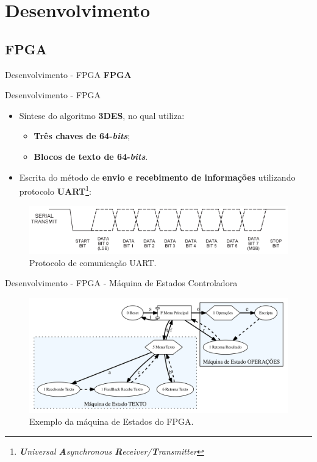 
\section{Desenvolvimento}
	\subsection{FPGA}
	\begin{frame}{Desenvolvimento - FPGA}
		\centering \color{blue} {\Huge \textbf{FPGA} \\[0.5cm]}%
	\end{frame}
	\begin{frame}{Desenvolvimento - FPGA}
		\begin{itemize}
			\item Síntese do algoritmo \textbf{3DES}, no qual utiliza:
			\begin{itemize}
				\item \textbf{Três chaves de 64-\textit{bits}};
				\item \textbf{Blocos de texto de 64-\textit{bits}}.
			\end{itemize}
			\bigskip
			\item Escrita do método de \textbf{envio e recebimento de informações} utilizando protocolo \textbf{UART}\footnote{\textit{\textbf{U}niversal \textbf{A}synchronous \textbf{R}eceiver/\textbf{T}ransmitter}}:
		\end{itemize}
		\begin{figure}[p]
			\centering
			\includegraphics[width=1\textwidth]{img/fpga/uart.png}
			\caption{Protocolo de comunicação UART.}
			\label{fig:uart}
		\end{figure}
	\end{frame}
	\begin{frame}{Desenvolvimento - FPGA - Máquina de Estados Controladora}
		\begin{figure}[p]
			\centering
			\includegraphics[width=1\textwidth]{img/fpga.png}
			\caption{Exemplo da máquina de Estados do FPGA.}
			\label{fig:mefpga}
		\end{figure}
	\end{frame}


